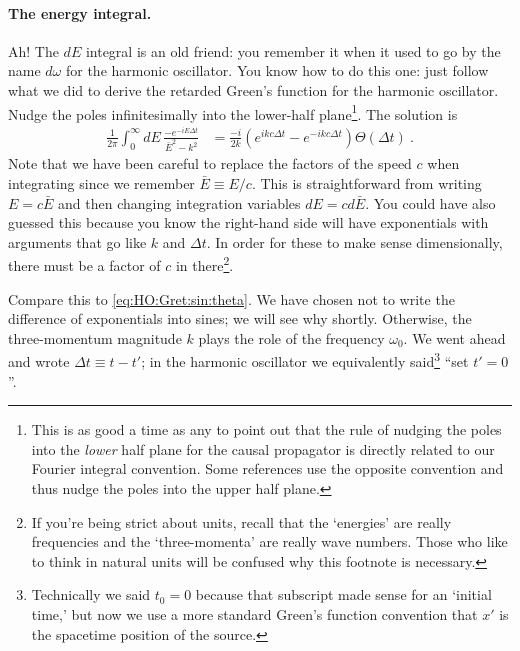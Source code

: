 \paragraph{The energy integral.} Ah! The $dE$ integral is an old friend: you remember it when it used to go by the name $d\omega$ for the harmonic oscillator. You know how to do this one: just follow what we did to derive the retarded Green's function for the harmonic oscillator. Nudge the poles infinitesimally into the lower-half plane\footnote{This is as good a time as any to point out that the rule of nudging the poles into the \emph{lower} half plane for the causal propagator is directly related to our Fourier integral convention. Some references use the opposite convention and thus nudge the poles into the upper half plane.}. The solution is
\begin{align}
	 \frac{1}{2\pi}\int_0^\infty dE \, 
	\frac{-e^{-iE \Delta t}}{\bar{E}^2-k^2}
	&= \frac{-i}{2k}\left(e^{ikc\Delta t} - e^{-ikc\Delta t}\right)\Theta(\Delta t) \ .
\end{align}
Note that we have been careful to replace the factors of the speed $c$ when integrating since we remember $\bar E \equiv E/c$. This is straightforward from writing $E = c\bar E$ and then changing integration variables $dE = cd\bar{E}$. You could have also guessed this because you know the right-hand side will have exponentials with arguments that go like $k$ and $\Delta t$. In order for these to make sense dimensionally, there must be a factor of $c$ in there\footnote{If you're being strict about units, recall that the `energies' are really frequencies and the `three-momenta' are really wave numbers. Those who like to think in natural units will be confused why this footnote is necessary.}.

Compare this to \eqref{eq:HO:Gret:sin:theta}. We have chosen not to write the difference of exponentials into sines; we will see why shortly. Otherwise, the three-momentum magnitude $k$ plays the role of the frequency $\omega_0$. We went ahead and wrote $\Delta t \equiv t-t'$; in the harmonic oscillator we equivalently said\footnote{Technically we said $t_0=0$ because that subscript made sense for an `initial time,' but now we use a more standard Green's function convention that $x'$ is the spacetime position of the source.} ``set $t'=0$''. 

